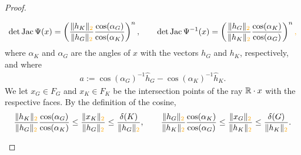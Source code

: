 \documentclass[10pt,letterpaper]{article}
\newcommand\cye[1]{%
  \protect\leavevmode
  \begingroup
    \color{red!35!yellow}%
    #1%
  \endgroup
}
\begin{document}
\begin{proof}
\begin{itemize}
\begin{gather*}
            \det\Jacobian\Psi(x)
            =
            \left( 
            \frac{ \| h_K \|_{\cye{2}} }{ \| h_{{G}} \|_{\cye{2}} }
            \frac{ \cos(\alpha_{{G}}) }{ \cos(\alpha_K) }
            \right)^{n},
            \qquad
            \det\Jacobian\Psi^{-1}(x)
            =
            \left( 
            \frac{ \| h_{{G}} \|_{\cye{2}} }{ \| h_{K} \|_{\cye{2}} }
            \frac{ \cos(\alpha_{K}) }{ \cos(\alpha_{{G}}) }
            \right)^{n}\cye{,}
        \end{gather*}
        where $\alpha_K$ and $\alpha_{{G}}$ are the angles of $x$ with the vectors $h_{{G}}$ and $h_{K}$, respectively,
        and where 
        \begin{align*}
            a := \cos(\alpha_{{G}})^{-1} \hat h_{{G}} - \cos(\alpha_K)^{-1} \hat h_K
            .
        \end{align*}
        We let $x_{G} \in F_{G}$ and $x_{K} \in F_{K}$ be the intersection points of the ray ${\mathbb R} \cdot x$ with the respective faces.
        By the definition of the cosine, 
        \begin{align*}
            \frac{ \| h_K \|_{\cye{2}} }{ \| h_{{G}} \|_{\cye{2}} }
            \frac{ \cos(\alpha_{{G}}) }{ \cos(\alpha_K) }
            \leq 
            \frac{ \| x_K \|_{\cye{2}} }{ \| h_{{G}} \|_{\cye{2}} }
            \leq 
            \frac{ \diam(K) }{ \| h_{{G}} \|_{\cye{2}} }
            ,
            \qquad 
            \frac{ \| h_{{G}} \|_{\cye{2}} }{ \| h_K \|_{\cye{2}} }
            \frac{ \cos(\alpha_K) }{ \cos(\alpha_{{G}}) }
            \leq 
            \frac{ \| x_{G} \|_{\cye{2}} }{ \| h_{K} \|_{\cye{2}} }
            \leq 
            \frac{ \diam(G) }{ \| h_{K} \|_{\cye{2}} }
            .
        \end{align*}


\end{itemize}
\end{proof}
\end{document}
